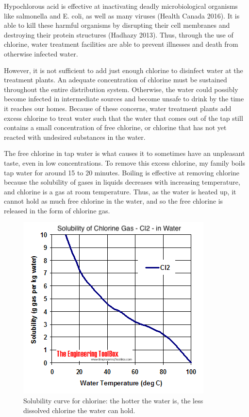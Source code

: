 \documentclass[11pt]{article}
\begin{document}
Hypochlorous acid is effective at inactivating deadly microbiological organisms like salmonella and E. coli, as well as many viruses (Health Canada 2016). It is able to kill these harmful organisms by disrupting their cell membranes and destroying their protein structures (Hadhazy 2013). Thus, through the use of chlorine, water treatment facilities are able to prevent illnesses and death from otherwise infected water.

However, it is not sufficient to add just enough chlorine to disinfect water at the treatment plants. An adequate concentration of chlorine must be sustained throughout the entire distribution system. Otherwise, the water could possibly become infected in intermediate sources and become unsafe to drink by the time it reaches our homes. Because of these concerns, water treatment plants add excess chlorine to treat water such that the water that comes out of the tap still contains a small concentration of free chlorine, or chlorine that has not yet reacted with undesired substances in the water.

The free chlorine in tap water is what causes it to sometimes have an unpleasant taste, even in low concentrations. To remove this excess chlorine, my family boils tap water for around 15 to 20 minutes. Boiling is effective at removing chlorine because the solubility of gases in liquids decreases with increasing temperature, and chlorine is a gas at room temperature. Thus, as the water is heated up, it cannot hold as much free chlorine in the water, and so the free chlorine is released in the form of chlorine gas.

\begin{figure}[H]
	\centering
	\caption{Solubility curve for chlorine: the hotter the water is, the less dissolved chlorine the water can hold.}
	\includegraphics[width=0.5\linewidth]{assets/cl-solubility.png}
\end{figure}
\end{document}
